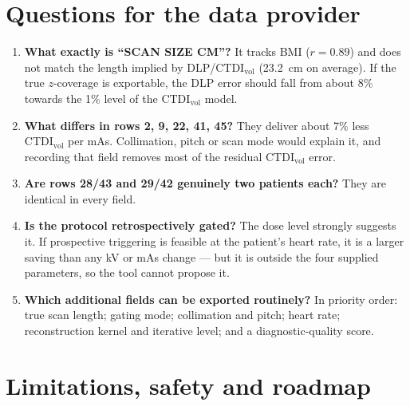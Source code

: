 \documentclass[10pt,a4paper]{article}
\newcommand{\ctdi}{\ensuremath{\mathrm{CTDI}_{\mathrm{vol}}}}
\begin{document}
\section{Questions for the data provider}
\begin{enumerate}
\item \textbf{What exactly is ``SCAN SIZE CM''?} It tracks BMI ($r = 0.89$) and does not match the length implied
by DLP/\ctdi{} (23.2~cm on average). If the true $z$-coverage is exportable, the DLP error should fall from about
8\% towards the 1\% level of the \ctdi{} model.
\item \textbf{What differs in rows 2, 9, 22, 41, 45?} They deliver about 7\% less \ctdi{} per mAs. Collimation,
pitch or scan mode would explain it, and recording that field removes most of the residual \ctdi{} error.
\item \textbf{Are rows 28/43 and 29/42 genuinely two patients each?} They are identical in every field.
\item \textbf{Is the protocol retrospectively gated?} The dose level strongly suggests it. If prospective
triggering is feasible at the patient's heart rate, it is a larger saving than any kV or mAs change --- but it is
outside the four supplied parameters, so the tool cannot propose it.
\item \textbf{Which additional fields can be exported routinely?} In priority order: true scan length; gating mode;
collimation and pitch; heart rate; reconstruction kernel and iterative level; and a diagnostic-quality score.
\end{enumerate}

\section{Limitations, safety and roadmap}
\end{document}

